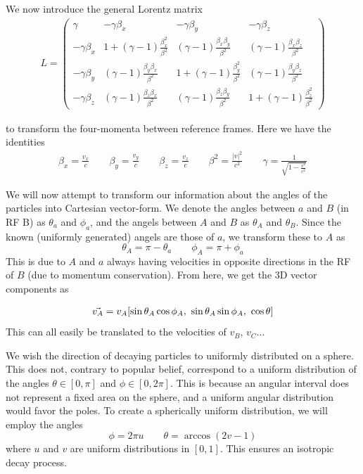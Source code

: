 \documentclass[12p,a4paper]{article}
\begin{document}
We now introduce the general Lorentz matrix 
\begin{align*}
    L = 
    \begin{pmatrix}
        \gamma     &-\gamma\beta_x   &-\gamma\beta_y  &-\gamma\beta_z \\
        -\gamma\beta_x  &1+(\gamma-1)\frac{\beta^2_x}{\beta^2}  &(\gamma-1)\frac{\beta_x\beta_y}{\beta^2}   &(\gamma-1)\frac{\beta_x\beta_z}{\beta^2}\\
        -\gamma\beta_y  &(\gamma-1)\frac{\beta_y\beta_x}{\beta^2}  &1+(\gamma-1)\frac{\beta_y^2}{\beta^2}   &(\gamma-1)\frac{\beta_y\beta_z}{\beta^2}\\
        -\gamma\beta_z  &(\gamma-1)\frac{\beta_z\beta_x}{\beta^2}  &(\gamma-1)\frac{\beta_z\beta_y}{\beta^2}   &1+(\gamma-1)\frac{\beta_z^2}{\beta^2} 
    \end{pmatrix}
\end{align*}

to transform the four-momenta between reference frames. Here we have the identities
\begin{align*}
    \beta_x = \frac{v_x}{c} \quad\quad \beta_y = \frac{v_y}{c} \quad\quad \beta_z = \frac{v_z}{c} \quad\quad \beta^2 = \frac{|v|^2}{c^2} \quad\quad \gamma = \frac{1}{\sqrt{1-\frac{v^2}{c^2}}}
\end{align*}

We will now attempt to transform our information about the angles of the particles into Cartesian vector-form. We denote the angles between $a$ and $B$ (in RF B) as $\theta_a$ and $\phi_a$, and the angels between $A$ and $B$ as $\theta_A$ and $\theta_B$. Since the known (uniformly generated) angels are those of $a$, we transform these to $A$ as
\[
    \theta_A = \pi - \theta_a \quad\quad \phi_A = \pi + \phi_a
\]
This is due to $A$ and $a$ always having velocities in opposite directions in the RF of $B$ (due to momentum conservation). From here, we get the 3D vector components as

\begin{align*}
    \vec{v_A} = v_A\qty[\sin{\theta_A}\cos{\phi_A},\ \sin{\theta_A}\sin{\phi_A},\ \cos{\theta}]
\end{align*}
This can all easily be translated to the velocities of $v_B$, $v_C$...

We wish the direction of decaying particles to uniformly distributed on a sphere. This does not, contrary to popular belief, correspond to a uniform distribution of the angles $\theta\in [0,\pi]$ and $\phi \in [0,2\pi]$. This is because an angular interval does not represent a fixed area on the sphere, and a uniform angular distribution would favor the poles. To create a spherically uniform distribution, we will employ the angles
\[
    \phi = 2\pi u   \quad\quad   \theta = \arccos(2v - 1)
\]
where $u$ and $v$ are uniform distributions in $[0, 1]$. This ensures an isotropic decay process.
\end{document}
